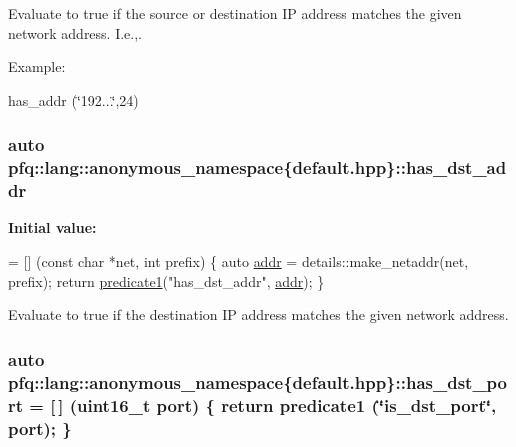 Evaluate to {\ttfamily true} if the source or destination I\+P address matches the given network address. I.\+e.,. 

Example\+:

has\+\_\+addr (\char`\"{}192...\char`\"{},24) \hypertarget{namespacepfq_1_1lang_1_1anonymous__namespace_02default_8hpp_03_a0a53822af0ed8ea341f16a1da5ea83e3}{
\subsubsection[{has\+\_\+dst\+\_\+addr}]{\setlength{\rightskip}{0pt plus 5cm}auto pfq\+::lang\+::anonymous\+\_\+namespace\{default.\+hpp\}\+::has\+\_\+dst\+\_\+addr}}\label{namespacepfq_1_1lang_1_1anonymous__namespace_02default_8hpp_03_a0a53822af0ed8ea341f16a1da5ea83e3}
{\bfseries Initial value\+:}
\begin{DoxyCode}
= [] (\textcolor{keyword}{const} \textcolor{keywordtype}{char} *net, \textcolor{keywordtype}{int} prefix)
        \{
            \textcolor{keyword}{auto} \hyperlink{namespacepfq_1_1lang_1_1anonymous__namespace_02default_8hpp_03_a13cabe468839119d8d68540e3c60718b}{addr} = details::make\_netaddr(net, prefix);
            \textcolor{keywordflow}{return} \hyperlink{namespacepfq_1_1lang_a3e018f096545ca95a68e67027c8e3144}{predicate1}(\textcolor{stringliteral}{"has\_dst\_addr"}, \hyperlink{namespacepfq_1_1lang_1_1anonymous__namespace_02default_8hpp_03_a13cabe468839119d8d68540e3c60718b}{addr});
        \}
\end{DoxyCode}


Evaluate to {\ttfamily true} if the destination I\+P address matches the given network address. 

\hypertarget{namespacepfq_1_1lang_1_1anonymous__namespace_02default_8hpp_03_afa71ece0f4178d0200c0388f503eef14}{
\subsubsection[{has\+\_\+dst\+\_\+port}]{\setlength{\rightskip}{0pt plus 5cm}auto pfq\+::lang\+::anonymous\+\_\+namespace\{default.\+hpp\}\+::has\+\_\+dst\+\_\+port = \mbox{[}$\,$\mbox{]} (uint16\+\_\+t {\bf port}) \{ return {\bf predicate1} (\char`\"{}is\+\_\+dst\+\_\+port\char`\"{}, port); \}}}\label{namespacepfq_1_1lang_1_1anonymous__namespace_02default_8hpp_03_afa71ece0f4178d0200c0388f503eef14}



